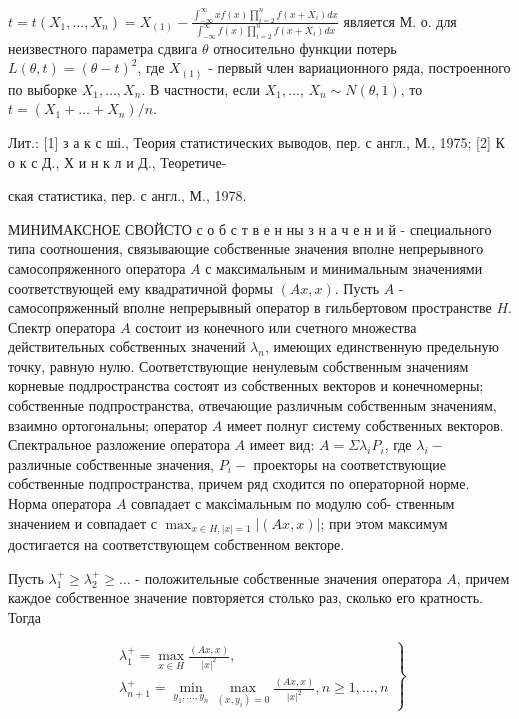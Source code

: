 \documentclass[10pt]{article}
\begin{document}
$t=t\left(X_{1}, \ldots, X_{n}\right)=X_{(1)}-\frac{\int_{-\infty}^{\infty} x f(x) \prod_{i=2}^{n} f\left(x+X_{i}\right) d x}{\int_{-\infty}^{\infty} f(x) \prod_{i=2}^{n} f\left(x+X_{i}\right) d x}$ является М. о. для неизвестного параметра сдвига $\theta$ относительно функции потерь $L(\theta, t)=(\theta-t)^{2}$, где $X_{(1)}$ - первый член вариационного ряда, построенного по выборке $X_{1}, \ldots, X_{n}$. В частности, если $X_{1}, \ldots$, $X_{n} \sim N(\theta, 1)$, то $t=\left(X_{1}+\ldots+X_{n}\right) / n$.



Лит.: [1] з а к с ші., Теория статистических выводов, пер. с англ., М., 1975; [2] К о к с Д., Х и н к л и Д., Теоретиче-

ская статистика, пер. с англ., М., 1978.



МИНИМАКСНОЕ СВОЙСТО с о б с т в е н ны з н а ч е н и й - специального типа соотношения, связывающие собственные значения вполне непрерывного самосопряженного оператора $A$ с максимальным и минимальным значениями соответствующей ему квадратичной формы $(A x, x)$. Пусть $A$ - самосопряженный вполне непрерывный оператор в гильбертовом пространстве $H$. Спектр оператора $A$ состоит из конечного или счетного множества действительных собственных значений $\lambda_{n}$, имеющих единственную предельную точку, равную нулю. Соответствующие ненулевым собственным значениям корневые подлространства состоят из собственных векторов и конечномерны; собственные подпространства, отвечающие различным собственным значениям, взаимно ортогональны; оператор $A$ имеет полнуг систему собственных векторов. Спектральное разложение оператора $A$ имеет вид: $A=\Sigma \lambda_{i} P_{i}$, где $\lambda_{i}-$ различные собственные значения, $P_{i}-$ проекторы на соответствующие собственные подпространства, причем ряд сходится по операторной норме. Норма оператора $A$ совпадает с максімальным по модулю соб- ственным значением и совпадает с $\max _{x \in H,|x|=1}|(A x, x)|$; при этом максимум достигается на соответствующем собственном векторе.



Пусть $\lambda_{1}^{+} \geqslant \lambda_{2}^{+} \geqslant \ldots$ - положительные собственные значения оператора $A$, причем каждое собственное значение повторяется столько раз, сколько его кратность. Тогда



\[

\left.\begin{array}{c}

\lambda_{1}^{+}=\max _{x \in H} \frac{(A x, x)}{|x|^{2}}, \\

\lambda_{n+1}^{+}=\min _{y_{1}, \ldots, y_{n}} \max _{\left(x, y_{i}\right)=0} \frac{(A x, x)}{|x|^{2}}, n \geqslant 1, \ldots, n

\end{array}\right\}

\]
\end{document}
